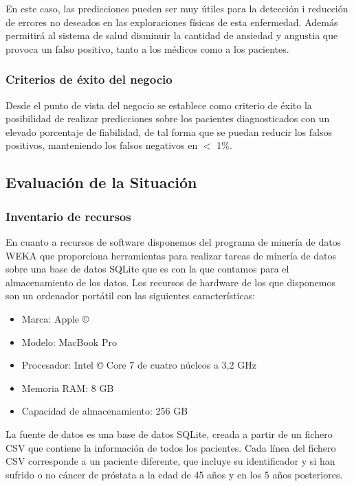 \documentclass{article}
\begin{document}
En este caso, las predicciones pueden ser muy útiles para la detección i reducción de errores no deseados en las exploraciones físicas de esta enfermedad. Además permitirá al sistema de salud disminuir la cantidad de ansiedad y angustia
que provoca un falso positivo, tanto a los médicos como a los pacientes.
	
\subsubsection{Criterios de éxito del negocio}
Desde el punto de vista del negocio se establece como criterio de éxito la posibilidad de realizar predicciones sobre los pacientes diagnosticados con un elevado porcentaje de fiabilidad, de tal forma que se puedan reducir los falsos positivos, manteniendo los falsos negativos en $<$ 1\%.

\subsection{Evaluación de la Situación}

\subsubsection{Inventario de recursos}\label{Inventario de recursos}
En cuanto a recursos de software disponemos del programa de minería de datos WEKA que proporciona herramientas para realizar tareas de minería de datos sobre una base de datos SQLite que es con la que contamos para el almacenamiento de los datos. Los recursos de hardware de los que disponemos son un ordenador portátil con las siguientes características:

\begin{itemize}
	\item Marca: Apple ©
	\item Modelo: MacBook Pro
	\item Procesador: Intel © Core 7 de cuatro núcleos a 3,2 GHz
	\item Memoria RAM: 8 GB
	\item Capacidad de almacenamiento: 256 GB
\end{itemize}

La fuente de datos es una base de datos SQLite, creada a partir de un fichero CSV que contiene la información de todos los pacientes. Cada línea del fichero CSV corresponde a un paciente diferente, que incluye su identificador y si han sufrido o no cáncer de próstata a la edad de 45 años y en los 5 años posteriores.
\end{document}
